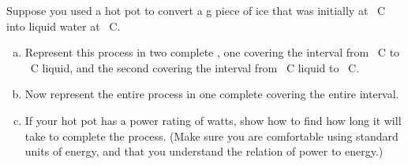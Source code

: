 \label{fnt1.2.1-3}

Suppose you used a hot pot to convert a \unit[150]{g} piece of ice that was initially at \unit[-15]{\textdegree C} into liquid water at \unit[50]{\textdegree C}.

\begin{enumerate}[(a)]
	\item Represent this process in two complete \EnergyDiagrams{}, one covering the interval from \unit[-15]{\textdegree C} to \unit[0]{\textdegree C} liquid, and the second covering the interval from \unit[0]{\textdegree C} liquid to \unit[50]{\textdegree C}.
	\item Now represent the entire process in one complete \EnergyDiagram{} covering the entire interval.
	\item If your hot pot has a power rating of \unit[600]{watts}, show how to find how long it will take to complete the process. (Make sure you are comfortable using standard units of energy, and that you understand the relation of power to energy.)
\end{enumerate}